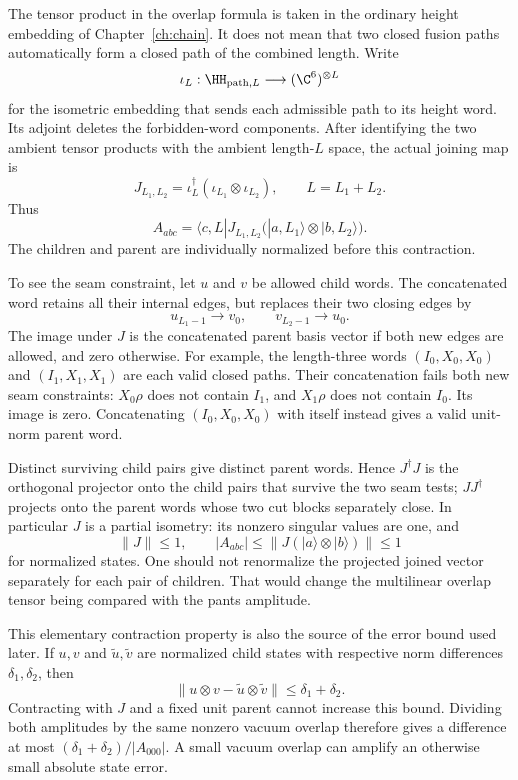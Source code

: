 The tensor product in the overlap formula is taken in the ordinary
height embedding of Chapter~\ref{ch:chain}. It does not mean that two
closed fusion paths automatically form a closed path of the combined
length. Write
\[
 \iota_L:\HH_{\mathrm{path},L}\longrightarrow(\C^6)^{\otimes L}
\]
for the isometric embedding that sends each admissible path to its
height word. Its adjoint deletes the forbidden-word components.
After identifying the two ambient tensor products with the ambient
length-$L$ space, the actual joining map is
\begin{equation}
 J_{L_1,L_2}
 =\iota_L^\dagger(\iota_{L_1}\otimes\iota_{L_2}),
 \qquad L=L_1+L_2.
 \label{eq:literal-joining-map}
\end{equation}
Thus
\[
 A_{abc}
 =\langle c,L|J_{L_1,L_2}
             \bigl(|a,L_1\rangle\otimes|b,L_2\rangle\bigr).
\]
The children and parent are individually normalized before this
contraction.

To see the seam constraint, let $u$ and $v$ be allowed child words.
The concatenated word retains all their internal edges, but replaces
their two closing edges by
\[
 u_{L_1-1}\longrightarrow v_0,\qquad
 v_{L_2-1}\longrightarrow u_0.
\]
The image under $J$ is the concatenated parent basis vector if both
new edges are allowed, and zero otherwise. For example, the length-three
words $(I_0,X_0,X_0)$ and $(I_1,X_1,X_1)$ are each valid closed
paths. Their concatenation fails both new seam constraints:
$X_0\rho$ does not contain $I_1$, and $X_1\rho$ does not contain
$I_0$. Its image is zero. Concatenating $(I_0,X_0,X_0)$ with
itself instead gives a valid unit-norm parent word.

Distinct surviving child pairs give distinct parent words. Hence
$J^\dagger J$ is the orthogonal projector onto the child pairs that
survive the two seam tests; $JJ^\dagger$ projects onto the parent
words whose two cut blocks separately close. In particular $J$ is
a partial isometry: its nonzero singular values are one, and
\[
 \|J\|\leq1,\qquad
 |A_{abc}|\leq
 \bigl\|J(|a\rangle\otimes|b\rangle)\bigr\|\leq1
\]
for normalized states. One should not renormalize the projected joined
vector separately for each pair of children. That would change the
multilinear overlap tensor being compared with the pants amplitude.

This elementary contraction property is also the source of the
error bound used later. If $u,v$ and $\widetilde u,\widetilde v$
are normalized child states with respective norm differences
$\delta_1,\delta_2$, then
\[
 \|u\otimes v-\widetilde u\otimes\widetilde v\|
 \leq\delta_1+\delta_2.
\]
Contracting with $J$ and a fixed unit parent cannot increase this
bound. Dividing both amplitudes by the same nonzero vacuum overlap
therefore gives a difference at most
$(\delta_1+\delta_2)/|A_{000}|$. A small vacuum overlap can amplify
an otherwise small absolute state error.

